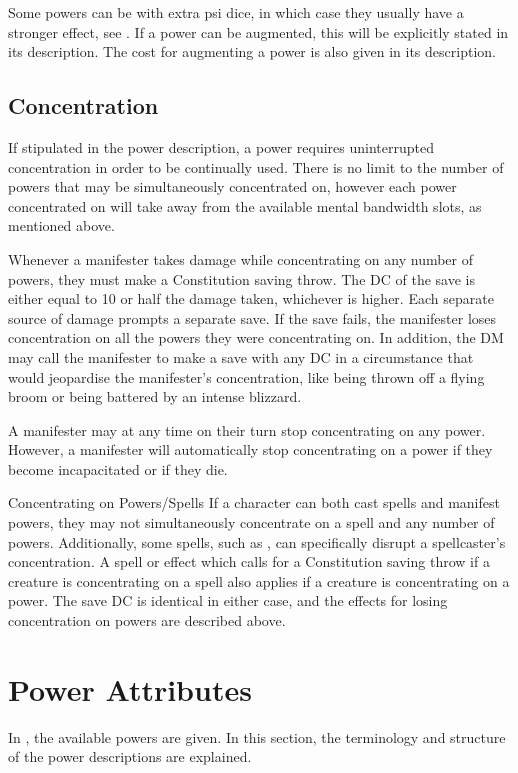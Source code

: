 Some powers can be  with extra psi dice, in which
case they usually have a stronger effect, see .
If a power can be augmented,
this will be explicitly stated in its description.
The cost for augmenting a power is also given in its description.

\subsection{Concentration}
\label{sub:concentration}
If stipulated in the power description,
a power requires uninterrupted concentration
in order to be continually used.
There is no limit to the number of powers that may be
simultaneously concentrated on,
however each power concentrated on will take away from the
available mental bandwidth slots, as mentioned above.

Whenever a manifester takes damage while
concentrating on any number of powers,
they must make a Constitution saving throw.
The DC of the save is either equal to 10 or half the damage taken,
whichever is higher.
Each separate source of damage prompts a separate save.
If the save fails,
the manifester loses concentration on all the powers they were
concentrating on.
In addition, the DM may call the manifester to make a
save with any DC in a circumstance that would
jeopardise the manifester's concentration,
like being thrown off a flying broom or
being battered by an intense blizzard.

A manifester may at any time on their turn
stop concentrating on any power.
However, a manifester will automatically stop concentrating on a power
if they become incapacitated or if they die.

\begin{DndSidebar}[float=htbp]{Concentrating on Powers/Spells}
    If a character
    can both cast spells and manifest powers,
    they may not simultaneously concentrate on a spell
    and any number of powers.
    Additionally, some spells, such as ,
    can specifically disrupt a spellcaster's concentration.
    A spell or effect which calls for a Constitution saving throw
    if a creature is concentrating on a spell
    also applies if a creature is concentrating on a power.
    The save DC is identical in either case,
    and the effects for losing concentration on powers
    are described above.
\end{DndSidebar}

\section{Power Attributes}
\label{sec:power_attributes}
In ,
the available powers are given.
In this section,
the terminology and structure of the power descriptions are explained.

